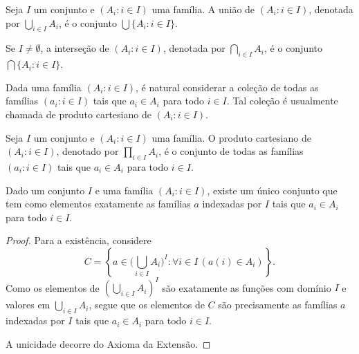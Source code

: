 \begin{definition}[$\BST$]\label{def:uniaoEIntersecaoDeFamilias}
    Seja $I$ um conjunto e $(A_i: i \in I)$ uma família.
    A união de $(A_i: i \in I)$, denotada por $\bigcup_{i\in I} A_i$, é o conjunto $\bigcup\{A_i: i \in I\}$.

    Se $I\neq \emptyset$, a interseção de $(A_i: i \in I)$, denotada por $\bigcap_{i\in I} A_i$, é o conjunto $\bigcap\{A_i: i \in I\}$.
\end{definition}
Dada uma família $(A_i: i \in I)$, é natural considerar a coleção de todas as famílias $(a_i: i \in I)$ tais que $a_i \in A_i$ para todo $i \in I$.
Tal coleção é usualmente chamada de produto cartesiano de $(A_i: i \in I)$.
\begin{definition}[$\ZmI$]\label{def:produtoCartesianoDeFamilias}
    Seja $I$ um conjunto e $(A_i: i \in I)$ uma família.
    O produto cartesiano de $(A_i: i \in I)$, denotado por $\prod_{i\in I} A_i$, é o conjunto de todas as famílias $(a_i: i \in I)$ tais que $a_i \in A_i$ para todo $i \in I$.
\end{definition}
\begin{lemma}[$\ZmI$]\label{lem:existenciaDoProdutoCartesianoDeFamilias}
    Dado um conjunto $I$ e uma família $(A_i: i \in I)$, existe um único conjunto que tem como elementos exatamente as famílias $a$ indexadas por $I$ tais que $a_i \in A_i$ para todo $i \in I$.
\end{lemma}
\begin{proof}
    Para a existência, considere
    \[
        C=\left\{a \in \Big(\bigcup_{i\in I} A_i\Big)^I : \forall i \in I\, (a(i) \in A_i)\right\}.
    \]
    Como os elementos de $(\bigcup_{i\in I} A_i)^I$ são exatamente as funções com domínio $I$ e valores em $\bigcup_{i\in I} A_i$, segue que os elementos de $C$ são precisamente as famílias $a$ indexadas por $I$ tais que $a_i \in A_i$ para todo $i \in I$.

    A unicidade decorre do Axioma da Extensão.
\end{proof}

